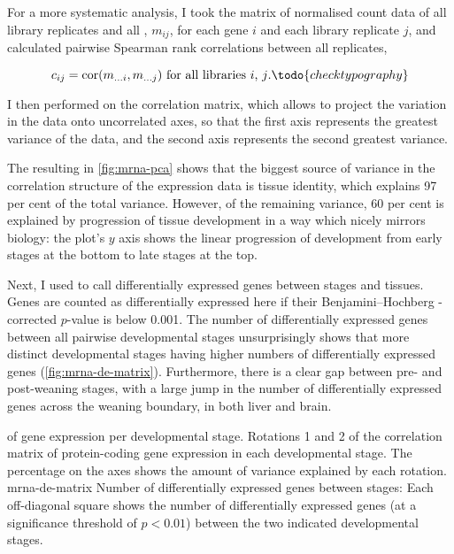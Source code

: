 For a more systematic analysis, I took the matrix of normalised count data of
all library replicates and all \mrna[s], \(m_{ij}\), for each \mrna gene \(i\)
and each library replicate \(j\), and calculated pairwise Spearman rank
correlations between all replicates,

\begin{equation}
    c_{ij} = \operatorname{cor}(m_{\dots i}, m_{\dots j}) \text{ for all
        libraries \(i\), \(j\).}\todo{check typography}
\end{equation}

I then performed \pca on the correlation matrix, which allows to project the
variation in the data onto uncorrelated axes, so that the first axis represents
the greatest variance of the data, and the second axis represents the second
greatest variance.

The resulting \pca in \cref{fig:mrna-pca} shows that the biggest source of
variance in the correlation structure of the expression data is tissue identity,
which explains \num{97} per cent of the total variance. However, of the
remaining variance, \num{60} per cent is explained by progression of tissue
development in a way which nicely mirrors biology: the plot’s \(y\) axis shows
the linear progression of development from early stages at the bottom to late
stages at the top.

Next, I used  \citep{Love:2014} to call differentially expressed
genes between stages and tissues. Genes are counted as differentially expressed
here if their Benjamini–Hochberg \fdr-corrected \(p\)-value is below
\num{0.001}. The number of differentially expressed genes between all pairwise
developmental stages unsurprisingly shows that more distinct developmental
stages having higher numbers of differentially expressed genes
(\cref{fig:mrna-de-matrix}). Furthermore, there is a clear gap between pre- and
post-weaning stages, with a large jump in the number of differentially expressed
genes across the weaning boundary, in both liver and brain.

    {\pca of \mrna gene expression per developmental stage.}
    {Rotations \num{1} and \num{2} of the correlation matrix of
    protein-coding gene expression in each developmental stage. The percentage
    on the axes shows the amount of variance explained by each rotation.}
    {mrna-de-matrix}
    {Number of differentially expressed \mrna genes between stages:}
    {Each off-diagonal square shows the number of differentially
    expressed genes (at a significance threshold of \(p<0.01\)) between
    the two indicated developmental stages.}


